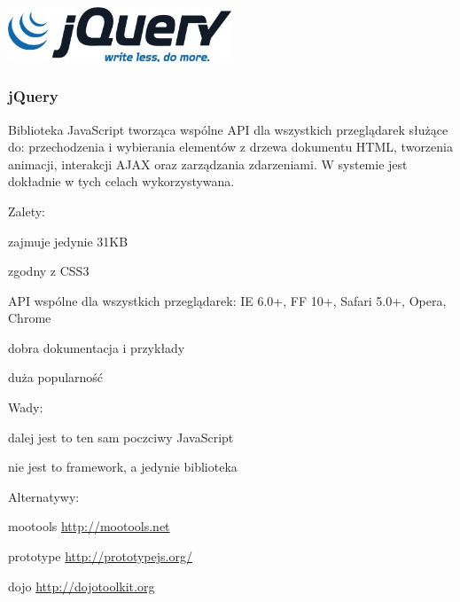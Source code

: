 \begin{minipage}{\textwidth}
    \begin{center}
        \includegraphics[width=0.5\textwidth]{img/logos/jquery.jpg}
    \end{center}
    \subsubsection{jQuery}
    Biblioteka JavaScript tworząca wspólne API dla wszystkich przeglądarek służące do: przechodzenia i wybierania elementów z drzewa dokumentu HTML, tworzenia animacji, interakcji AJAX oraz zarządzania zdarzeniami. W systemie jest dokładnie w tych celach wykorzystywana.

    Zalety:
    \begin{packed_item}
        \item{zajmuje jedynie 31KB}
        \item{zgodny z CSS3}
        \item{API wspólne dla wszystkich przeglądarek: IE 6.0+, FF 10+, Safari 5.0+, Opera, Chrome}
        \item{dobra dokumentacja i przykłady}
        \item{duża popularność}
    \end{packed_item}

    Wady:
    \begin{packed_item}
        \item{dalej jest to ten sam poczciwy JavaScript}
        \item{nie jest to framework, a jedynie biblioteka}
    \end{packed_item}

    Alternatywy:
    \begin{packed_item}
        \item{mootools \url{http://mootools.net}}
        \item{prototype \url{http://prototypejs.org/}}
        \item{dojo \url{http://dojotoolkit.org}}
    \end{packed_item}
\end{minipage}

